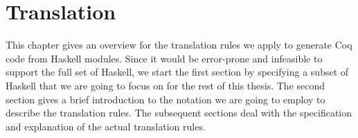\chapter{Translation} \label{chp:translation}

This chapter gives an overview for the translation rules we apply to generate Coq code from Haskell modules.
Since it would be error-prone and infeasible to support the full set of Haskell, we start the first section by specifying a subset of Haskell that we are going to focus on for the rest of this thesis.
The second section gives a brief introduction to the notation we are going to employ to describe the translation rules.
The subsequent sections deal with the specification and explanation of the actual translation rules.








